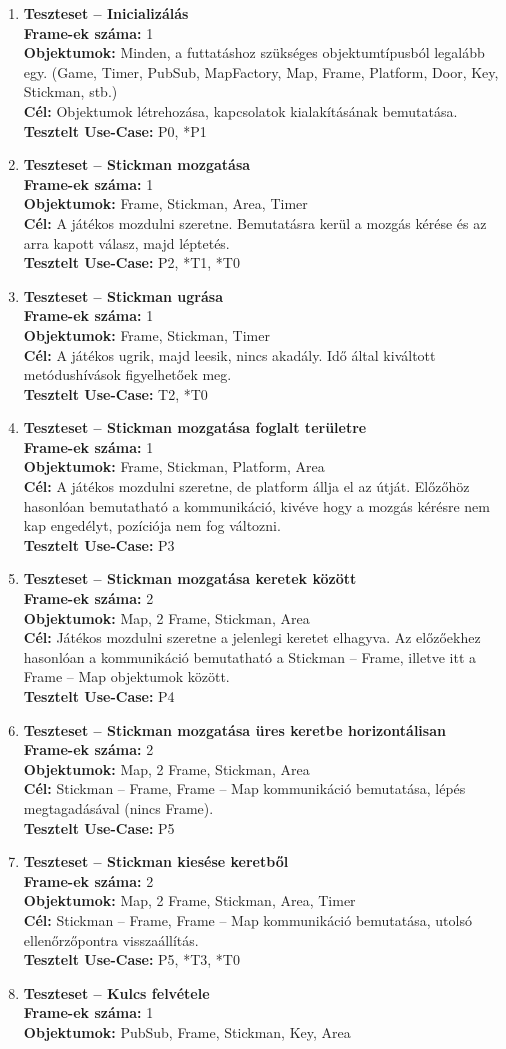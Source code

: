 		\begin{enumerate}[label=\textbf{\arabic*.}, start=0]
		
			\newcommand{\testitem}[1]{\item \textbf{Teszteset -- #1}\\}
			\newcommand{\tframe}[1]{\textbf{Frame-ek száma:} #1\\}
			\newcommand{\tobjekt}[1]{\textbf{Objektumok:} #1\\}
			\newcommand{\tcel}[1]{\textbf{Cél:} #1\\}
			\newcommand{\tuse}[1]{\textbf{Tesztelt Use-Case:} #1\\}
		
			\testitem{Inicializálás}
				\tframe{1}
				\tobjekt{Minden, a futtatáshoz szükséges objektumtípusból legalább egy.
					(Game, Timer, PubSub, MapFactory, Map, Frame, Platform, Door, Key, Stickman, stb.)}
				\tcel{Objektumok létrehozása, kapcsolatok kialakításának bemutatása.}
				\tuse{P0, *P1}
			\testitem{Stickman mozgatása}
				\tframe{1}
				\tobjekt{Frame, Stickman, Area, Timer}
				\tcel{A játékos mozdulni szeretne. Bemutatásra kerül a mozgás kérése és az arra kapott válasz, majd léptetés.} 
				\tuse{P2, *T1, *T0}
			\testitem{Stickman ugrása}
				\tframe{1}
				\tobjekt{Frame, Stickman, Timer}
				\tcel{A játékos ugrik, majd leesik, nincs akadály. Idő által kiváltott metódushívások figyelhetőek meg.} 
				\tuse{T2, *T0}
			\testitem{Stickman mozgatása foglalt területre}
				\tframe{1}
				\tobjekt{Frame, Stickman, Platform, Area}
				\tcel{A játékos mozdulni szeretne, de platform állja el az útját. Előzőhöz hasonlóan bemutatható a kommunikáció, kivéve hogy a mozgás kérésre nem kap engedélyt, pozíciója nem fog változni.}
				\tuse{P3}
			\testitem{Stickman mozgatása keretek között}
				\tframe{2}
				\tobjekt{Map, 2 Frame, Stickman, Area}
				\tcel{Játékos mozdulni szeretne a jelenlegi keretet elhagyva. Az előzőekhez hasonlóan a kommunikáció bemutatható a Stickman -- Frame, illetve itt a Frame -- Map objektumok között.}
				\tuse{P4}
			\testitem{Stickman mozgatása üres keretbe horizontálisan}
				\tframe{2}
				\tobjekt{Map, 2 Frame, Stickman, Area}
				\tcel{Stickman -- Frame, Frame -- Map kommunikáció bemutatása, lépés megtagadásával (nincs Frame).}
				\tuse{P5}
			\testitem{Stickman kiesése keretből}
				\tframe{2}
				\tobjekt{Map, 2 Frame, Stickman, Area, Timer}
				\tcel{Stickman -- Frame, Frame -- Map kommunikáció bemutatása, utolsó ellenőrzőpontra visszaállítás.}
				\tuse{P5, *T3, *T0}
			\testitem{Kulcs felvétele}
				\tframe{1}
				\tobjekt{PubSub, Frame, Stickman, Key, Area}

\end{enumerate}
